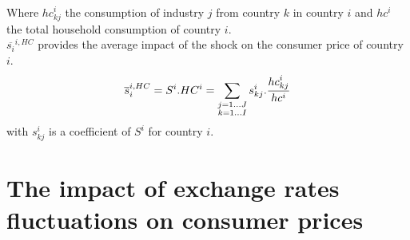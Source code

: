 \documentclass[11pt,a4paper]{article}
\begin{document}
Where ${hc}_{kj}^i$ the consumption of industry $j$ from country $k$ in country $i$ and $hc^i$ the total household consumption of country $i$. \\
$\overline{s_{i}}^{i,HC}$ provides the average impact of the shock on the consumer price of country $i$. 
 \begin{eqnarray}
\overline{s}_{i}^{i,HC}=S^i.HC^i=\underset{\begin{subarray}{c}j=1\dots J \\ k=1 \dots I \end{subarray}}{\mathop \sum}\,{{s}_{kj}^i}.\frac{{hc}_{kj}^i}{hc^i}
\label{eq:eq6}
 \end{eqnarray} 
with ${s}_{kj}^i$ is a coefficient of $S^i$ for country $i$. 

\section{The impact of exchange rates fluctuations on consumer prices}
\label{sec:prixconso}
\end{document}
